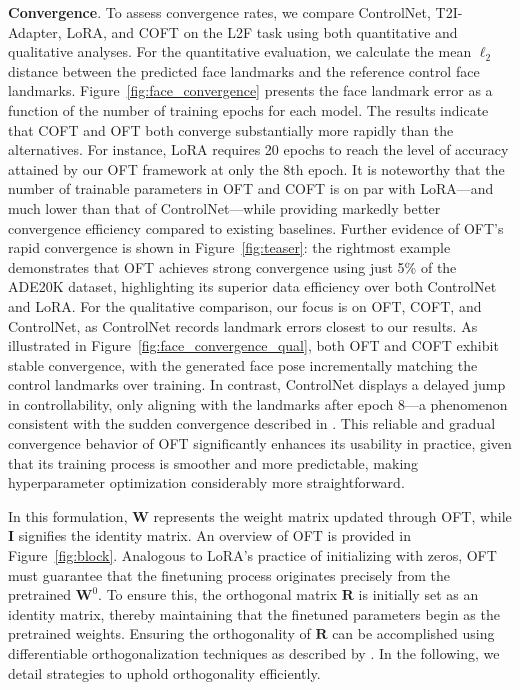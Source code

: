 \textbf{Convergence}. To assess convergence rates, we compare ControlNet, T2I-Adapter, LoRA, and COFT on the L2F task using both quantitative and qualitative analyses. For the quantitative evaluation, we calculate the mean $\ell_2$ distance between the predicted face landmarks and the reference control face landmarks. Figure~\ref{fig:face_convergence} presents the face landmark error as a function of the number of training epochs for each model. The results indicate that COFT and OFT both converge substantially more rapidly than the alternatives. For instance, LoRA requires 20 epochs to reach the level of accuracy attained by our OFT framework at only the 8th epoch. It is noteworthy that the number of trainable parameters in OFT and COFT is on par with LoRA—and much lower than that of ControlNet—while providing markedly better convergence efficiency compared to existing baselines. Further evidence of OFT’s rapid convergence is shown in Figure~\ref{fig:teaser}: the rightmost example demonstrates that OFT achieves strong convergence using just 5\% of the ADE20K dataset, highlighting its superior data efficiency over both ControlNet and LoRA. For the qualitative comparison, our focus is on OFT, COFT, and ControlNet, as ControlNet records landmark errors closest to our results. As illustrated in Figure~\ref{fig:face_convergence_qual}, both OFT and COFT exhibit stable convergence, with the generated face pose incrementally matching the control landmarks over training. In contrast, ControlNet displays a delayed jump in controllability, only aligning with the landmarks after epoch 8—a phenomenon consistent with the sudden convergence described in \cite{zhang2023adding}. This reliable and gradual convergence behavior of OFT significantly enhances its usability in practice, given that its training process is smoother and more predictable, making hyperparameter optimization considerably more straightforward.

In this formulation, $\bm{W}$ represents the weight matrix updated through OFT, while $\bm{I}$ signifies the identity matrix. An overview of OFT is provided in Figure~\ref{fig:block}. Analogous to LoRA's practice of initializing with zeros, OFT must guarantee that the finetuning process originates precisely from the pretrained $\bm{W}^0$. To ensure this, the orthogonal matrix $\bm{R}$ is initially set as an identity matrix, thereby maintaining that the finetuned parameters begin as the pretrained weights. Ensuring the orthogonality of $\bm{R}$ can be accomplished using differentiable orthogonalization techniques as described by \cite{liu2021orthogonal,lezcano2019cheap}. In the following, we detail strategies to uphold orthogonality efficiently.

